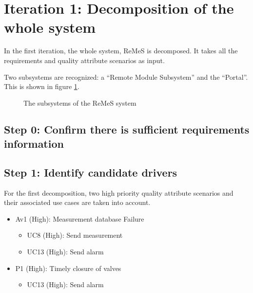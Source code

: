 \section{Iteration 1: Decomposition of the whole system}
\label{add:it1}

\npar In the first iteration, the whole system, ReMeS is decomposed. It takes
all the requirements and quality attribute scenarios as input.

\npar Two subsystems are recognized: a ``Remote Module Subsystem'' and the
``Portal''. This is shown in figure \ref{fig:add/it1/decomposition}.

\begin{figure}[H]
	\begin{centering}
		\caption{The subsystems of the ReMeS system}
		\label{fig:add/it1/decomposition}
	\end{centering}
\end{figure}

\subsection{Step 0: Confirm there is sufficient requirements information} 


\subsection{Step 1: Identify candidate drivers}
\label{add:it1/drivers}


\npar For the first decomposition, two high priority quality attribute scenarios
and their associated use cases are taken into account. 

\begin{itemize}
 	\item Av1 (High): Measurement database Failure
 	\begin{itemize}
 		\item UC8 (High): Send measurement
 		\item UC13 (High): Send alarm 
 	\end{itemize}
  	\item P1 (High): Timely closure of valves
  	\begin{itemize}
  		\item UC13 (High): Send alarm 
  	\end{itemize}
\end{itemize}

